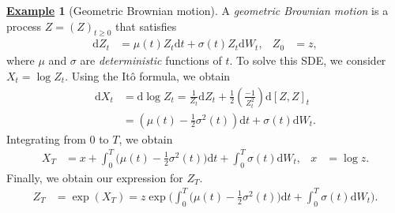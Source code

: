 \documentclass[12pt]{book}
\numberwithin{equation}{chapter}
\theoremstyle{plain}
\numberwithin{theorem}{section}
\theoremstyle{definition}
\newtheorem{example}[theorem]{\underline{Example}}
\numberwithin{exercise}{chapter}
\newcommand{\<}{\langle}
\renewcommand{\>}{\rangle}
\renewcommand{\(}{\left(}
\renewcommand{\)}{\right)}
\renewcommand{\[}{\left[}
\renewcommand{\]}{\right]}
\newcommand\sig{\sigma}
\newcommand\dd{\mathrm{d}}
\begin{document}
\begin{example}[Geometric Brownian motion]
\label{ex:gbm}
A \emph{geometric Brownian motion} is a process $Z = (Z)_{t \geq 0}$ that satisfies
\begin{align}
\dd Z_t
	&=	\mu(t) Z_t \dd t + \sig(t) Z_t \dd W_t , &
Z_0
	&=	z ,
\end{align}
where $\mu$ and $\sig$ are \emph{deterministic} functions of $t$.
To solve this SDE, we consider $X_t = \log Z_t$.  Using the It\^o formula, we obtain
\begin{align}
\dd X_t
	&=	\dd \log Z_t
	=		\frac{1}{Z_t} \dd Z_t + \frac{1}{2} \( \frac{-1}{Z_t^2} \) \dd[Z,Z]_t \\
	&=	\( \mu(t) - \tfrac{1}{2} \sig^2(t) \) \dd t + \sig(t) \dd W_t .
\end{align}
Integrating from $0$ to $T$, we obtain
\begin{align}
X_T
	&=	x + \int_0^T \big( \mu(t) - \tfrac{1}{2} \sig^2(t) \big) \dd t + \int_0^T \sig(t)  \dd W_t , &
x
	&= \log z .
\end{align}
Finally, we obtain our expression for $Z_T$.
\begin{align}
Z_T
	&=	\exp \( X_T \)
	=		z \exp \Big( \int_0^T \big( \mu(t) - \tfrac{1}{2} \sig^2(t) \big) \dd t + \int_0^T \sig(t)  \dd W_t \Big) .
\end{align}
\end{example}
\end{document}
